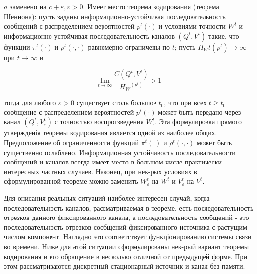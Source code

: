 \documentclass[10pt]{article}
\begin{document}
$a$ заменено на $a+\varepsilon, \varepsilon>0$. Имеет место теорема кодирования (теорема Шеннона): пусть заданы информационно-устойчивая последовательность сообщений с распределением вероятностей $p^{t}(\cdot)$ и условиями точности $W^{t}$ и информационно-устойчивая последовательность каналов $\left(Q^{t}, V^{t}\right)$ такие, что функции $\pi^{t}(\cdot)$ и $\rho^{t}(\cdot, \cdot)$ равномерно ограничены по $t$; пусть $H_{W} t\left(p^{t}\right) \rightarrow \infty$ при $t \rightarrow \infty$ и



\[

\lim _{t \rightarrow \infty} \frac{C\left(Q^{t}, V^{t}\right)}{H_{W}{ }^{\left(p^{t}\right)}}>1

\]



тогда для любого $\varepsilon>0$ существует столь большое $t_{0}$, что при всех $t \geqslant t_{0}$ сообщение с распределением вероятностей $p^{t}(\cdot)$ может быть передано через канал $\left(Q^{t}, V_{\varepsilon}^{t}\right)$ с точностью воспрогзведения $W_{\varepsilon}^{t}$. Эта формулировка прямого утвержденія теоремы кодирования является одной из наиболее общих. Предположение об ограниченности функций $\pi^{t}(\cdot)$ и $\rho^{t}(\cdot, \cdot)$ может быть существенно ослаблено. Информационная устойчивость последовательности сообщений и каналов всегда имеет место в большөм числе практически интересных частных случаев. Наконец, при нек-рых условиях в сформулированной теореме можно заменить $W_{\varepsilon}^{t}$ на $W^{t}$ и $V_{\varepsilon}^{t}$ на $V^{t}$.



Для онисания реальных ситуаций наиболее интересен случай, когда последовательность каналов, рассматриваемая в теореме, есть последовательность отрезков данного фиксированного канала, а последовательность сообщений - это последовательность отрезков сообщений фиксированного источника с растущим числом компонент. Наглядно это соответствует функціонированию системы связи во времени. Ниже для әтой ситуации сформулированы нек-рый вариант теоремы кодирования и его обращение в несколько отличной от предыдущей форме. При этом рассматриваются дискретный стационарный источник и канал без памяти.
\end{document}
